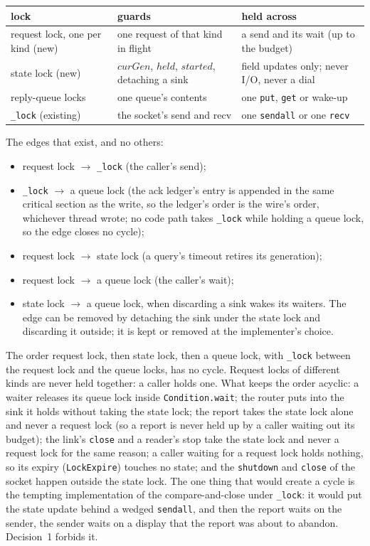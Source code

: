 \documentclass[a4paper,10pt,fleqn]{article}
\begin{document}
\begin{center}
\begin{tabular}{lll}
  lock & guards & held across \\ \hline
  request lock, one per kind (new) & one request of that kind in flight & a send and its wait (up to the budget) \\
  state lock (new) & $curGen$, $held$, $started$, detaching a sink & field updates only; never I/O, never a dial \\
  reply-queue locks & one queue's contents & one \texttt{put}, \texttt{get} or wake-up \\
  \texttt{\_lock} (existing) & the socket's send and recv & one \texttt{sendall} or one \texttt{recv} \\
\end{tabular}
\end{center}

The edges that exist, and no others:
\begin{itemize}
  \item request lock $\to$ \texttt{\_lock} (the caller's send);
  \item \texttt{\_lock} $\to$ a queue lock (the ack ledger's entry is appended in
    the same critical section as the write, so the ledger's order is the
    wire's order, whichever thread wrote; no code path takes \texttt{\_lock}
    while holding a queue lock, so the edge closes no cycle);
  \item request lock $\to$ state lock (a query's timeout retires its
    generation);
  \item request lock $\to$ a queue lock (the caller's wait);
  \item state lock $\to$ a queue lock, when discarding a sink wakes its waiters.
    The edge can be removed by detaching the sink under the state lock and
    discarding it outside; it is kept or removed at the implementer's choice.
\end{itemize}
The order request lock, then state lock, then a queue lock, with
\texttt{\_lock} between the request lock and the queue locks, has no cycle.  Request locks of
different kinds are never held together: a caller holds one.  What keeps the
order acyclic: a waiter releases its queue lock inside \texttt{Condition.wait};
the router puts into the sink it holds without taking the state lock; the
report takes the state lock alone and never a request lock (so a report is
never held up by a caller waiting out its budget); the link's \texttt{close}
and a reader's stop take the state lock and never a request lock for the same
reason; a caller waiting for a request lock holds nothing, so its expiry
(\texttt{LockExpire}) touches no state; and the \texttt{shutdown} and
\texttt{close} of the socket happen outside the state lock.  The one thing that
would create a cycle is the tempting implementation of the compare-and-close
under \texttt{\_lock}: it would put the state update behind a wedged
\texttt{sendall}, and then the report waits on the sender, the sender waits on
a display that the report was about to abandon.  Decision~1 forbids it.
\end{document}
